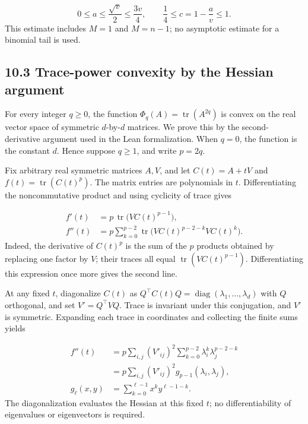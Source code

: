 \documentclass[11pt,a4paper]{article}
\begin{document}
\begin{equation}
0\le a\le\frac{\sqrt v}{2}\le\frac{3v}{4},
\qquad \frac14\le c=1-\frac av\le1.
\tag{10.7}
\end{equation}
This estimate includes \(M=1\) and \(M=n-1\); no asymptotic estimate for a binomial tail is used.

\subsection*{10.3 Trace-power convexity by the Hessian argument}
For every integer \(q\ge0\), the function \(\Phi_q(A)=\operatorname{tr}(A^{2q})\) is convex on the real vector space of symmetric \(d\)-by-\(d\) matrices. We prove this by the second-derivative argument used in the Lean formalization. When \(q=0\), the function is the constant \(d\). Hence suppose \(q\ge1\), and write \(p=2q\).

Fix arbitrary real symmetric matrices \(A,V\), and let \(C(t)=A+tV\) and \(f(t)=\operatorname{tr}(C(t)^p)\). The matrix entries are polynomials in \(t\). Differentiating the noncommutative product and using cyclicity of trace gives

\begin{equation*}
\begin{aligned}
f'(t)&=p\,\operatorname{tr}\bigl(V C(t)^{p-1}\bigr),\\
f''(t)&=p\sum_{k=0}^{p-2}
 \operatorname{tr}\bigl(V C(t)^{p-2-k}V C(t)^k\bigr).
\end{aligned}
\end{equation*}
Indeed, the derivative of \(C(t)^p\) is the sum of the \(p\) products obtained by replacing one factor by \(V\); their traces all equal \(\operatorname{tr}(V C(t)^{p-1})\). Differentiating this expression once more gives the second line.

At any fixed \(t\), diagonalize \(C(t)\) as \(Q^\top C(t)Q=\operatorname{diag}(\lambda_1,\ldots,\lambda_d)\) with \(Q\) orthogonal, and set \(V'=Q^\top VQ\). Trace is invariant under this conjugation, and \(V'\) is symmetric. Expanding each trace in coordinates and collecting the finite sums yields

\begin{equation*}
\begin{aligned}
f''(t)
 &=p\sum_{i,j}(V'_{ij})^2
   \sum_{k=0}^{p-2}\lambda_i^k\lambda_j^{p-2-k}\\
 &=p\sum_{i,j}(V'_{ij})^2 g_{p-1}(\lambda_i,\lambda_j),\\
g_\ell(x,y)&=\sum_{k=0}^{\ell-1}x^k y^{\ell-1-k}.
\end{aligned}
\end{equation*}
The diagonalization evaluates the Hessian at this fixed \(t\); no differentiability of eigenvalues or eigenvectors is required.
\end{document}
